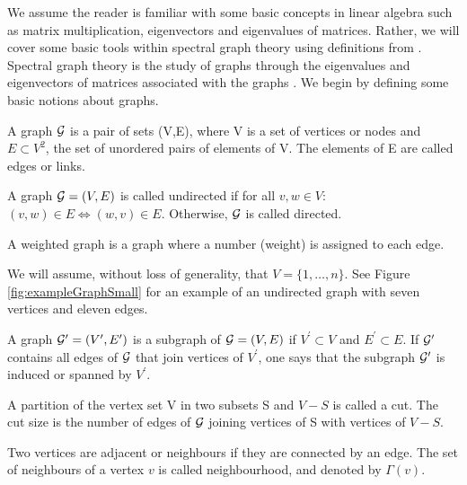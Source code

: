 We assume the reader is familiar with some basic concepts in linear algebra such as matrix multiplication, eigenvectors and eigenvalues of matrices. Rather, we will cover some basic tools within spectral graph theory using definitions from \cite{For10,New06a, Spi12, Spi07}. Spectral graph theory is the study of graphs through the eigenvalues and eigenvectors of matrices associated with the graphs \cite{Spi12}. We begin by defining some basic notions about graphs.
\begin{definition}
	\label{def:graph}
	A graph $\mathcal G$ is a pair of sets (V,E), where V is a set of vertices or nodes and $E \subset V^{2}$, the set of unordered pairs of elements of V. The elements of E are called edges or links.
\end{definition}
\begin{definition}
	\label{def:undirectedGraph}
	A graph $\mathcal G = (V,E)$ is called undirected if for all $v,w \in V$: $(v,w) \in E \iff (w,v) \in E$. Otherwise, $\mathcal G$ is called directed.
\end{definition}
\begin{definition}
	\label{def:weightedGraph}
	A weighted graph is a graph where a number (weight) is assigned to each edge.
\end{definition}
We will assume, without loss of generality, that $V = \{1,\dots,n\}$. See Figure \ref{fig:exampleGraphSmall} for an example of an undirected graph with seven vertices and eleven edges.
\begin{definition}
	\label{def:subGraph}
	A graph $\mathcal G^{\prime} = (V^{\prime},E^{\prime})$ is a subgraph of $\mathcal G = (V,E)$ if $V^{\prime} \subset V$ and $E^{\prime} \subset E$. If $\mathcal G^{\prime}$ contains all edges of $\mathcal G$ that join vertices of $V^{\prime}$, one says that the subgraph $\mathcal G^{\prime}$ is induced or spanned by $V^{\prime}$.
\end{definition}
\begin{definition}
	\label{def:cuts}
	A partition of the vertex set V in two subsets S and $V-S$ is called a cut. The cut size is the number of edges of $\mathcal G$ joining vertices of S with vertices of $V-S$.
\end{definition}
\begin{definition}
	\label{def:neighbourhoodNode}
	Two vertices are adjacent or neighbours if they are connected by an edge. The set of neighbours of a vertex $v$ is called neighbourhood, and denoted by $\Gamma(v)$.
\end{definition}
